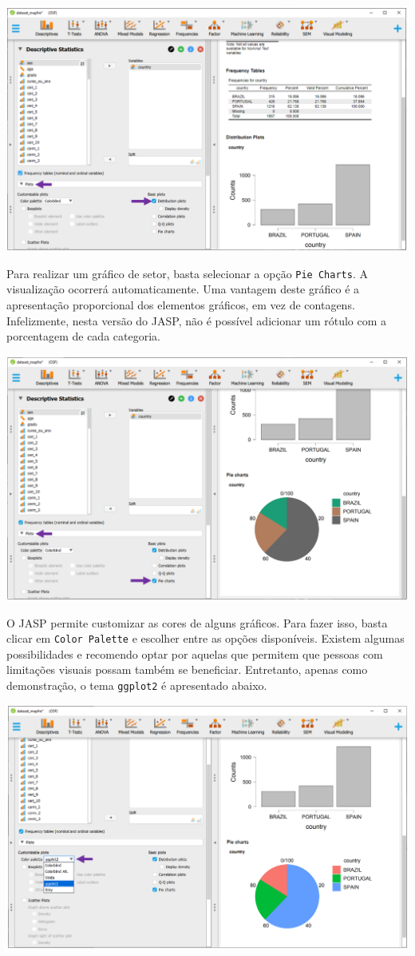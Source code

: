 \documentclass[
]{book}
\begin{document}
\includegraphics{./img/cap_desc_jasp_grafico_barras.png}

Para realizar um gráfico de setor, basta selecionar a opção \texttt{Pie\ Charts}. A visualização ocorrerá automaticamente. Uma vantagem deste gráfico é a apresentação proporcional dos elementos gráficos, em vez de contagens. Infelizmente, nesta versão do JASP, não é possível adicionar um rótulo com a porcentagem de cada categoria.

\includegraphics{./img/cap_desc_jasp_grafico_setor.png}

O JASP permite customizar as cores de alguns gráficos. Para fazer isso, basta clicar em \texttt{Color\ Palette} e escolher entre as opções disponíveis. Existem algumas possibilidades e recomendo optar por aquelas que permitem que pessoas com limitações visuais possam também se beneficiar. Entretanto, apenas como demonstração, o tema \texttt{ggplot2} é apresentado abaixo.

\includegraphics{./img/cap_desc_jasp_grafico_setor2.png}
\end{document}
